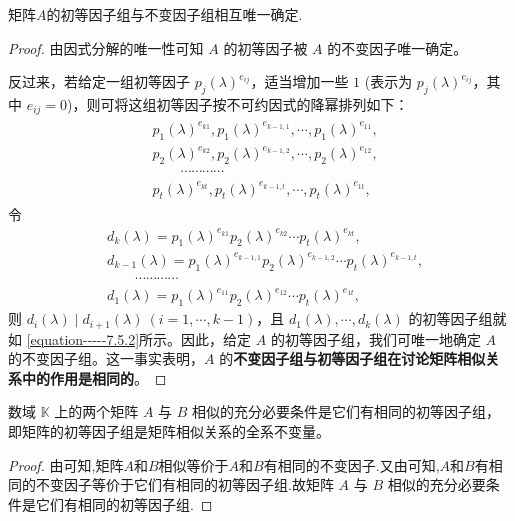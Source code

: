 \documentclass[../../main.tex]{subfiles}%
\begin{document}
\begin{proposition}\label{proposition:初等因子组与不变因子组相互唯一确定}
矩阵$A$的初等因子组与不变因子组相互唯一确定.
\end{proposition}
\begin{proof}

由因式分解的唯一性可知 $A$ 的初等因子被 $A$ 的不变因子唯一确定。

反过来，若给定一组初等因子 $p_j(\lambda)^{e_{ij}}$，适当增加一些 $1$ (表示为 $p_j(\lambda)^{e_{ij}}$，其中 $e_{ij}=0$)，则可将这组初等因子按不可约因式的降幂排列如下：
\begin{align}\label{equation-----7.5.2}
\begin{aligned}
&p_1(\lambda)^{e_{k1}},p_1(\lambda)^{e_{k - 1,1}},\cdots,p_1(\lambda)^{e_{11}},\\
&p_2(\lambda)^{e_{k2}},p_2(\lambda)^{e_{k - 1,2}},\cdots,p_2(\lambda)^{e_{12}},\\
&\quad \quad \cdots\cdots\cdots\cdots\\
&p_t(\lambda)^{e_{kt}},p_t(\lambda)^{e_{k - 1,t}},\cdots,p_t(\lambda)^{e_{1t}},
\end{aligned}
\end{align}
令
\begin{align*}
&d_k(\lambda)=p_1(\lambda)^{e_{k1}}p_2(\lambda)^{e_{k2}}\cdots p_t(\lambda)^{e_{kt}},\\
&d_{k - 1}(\lambda)=p_1(\lambda)^{e_{k - 1,1}}p_2(\lambda)^{e_{k - 1,2}}\cdots p_t(\lambda)^{e_{k - 1,t}},\\
&\quad \quad \cdots\cdots\cdots\cdots\\
&d_1(\lambda)=p_1(\lambda)^{e_{11}}p_2(\lambda)^{e_{12}}\cdots p_t(\lambda)^{e_{1t}},
\end{align*}
则 $d_i(\lambda)\mid d_{i + 1}(\lambda)\ (i = 1,\cdots,k - 1)$，且 $d_1(\lambda),\cdots,d_k(\lambda)$ 的初等因子组就如 \eqref{equation-----7.5.2}所示。因此，给定 $A$ 的初等因子组，我们可唯一地确定 $A$ 的不变因子组。这一事实表明，$A$ 的\textbf{不变因子组与初等因子组在讨论矩阵相似关系中的作用是相同的}。 

\end{proof}


\begin{theorem}\label{theorem:矩阵相似的充分必要条件是它们有相同的初等因子组}
数域 $\mathbb{K}$ 上的两个矩阵 $A$ 与 $B$ 相似的充分必要条件是它们有相同的初等因子组，即矩阵的初等因子组是矩阵相似关系的全系不变量。 
\end{theorem}
\begin{proof}

由可知,矩阵$A$和$B$相似等价于$A$和$B$有相同的不变因子.又由可知,$A$和$B$有相同的不变因子等价于它们有相同的初等因子组.故矩阵 $A$ 与 $B$ 相似的充分必要条件是它们有相同的初等因子组.

\end{proof}
\end{document}
